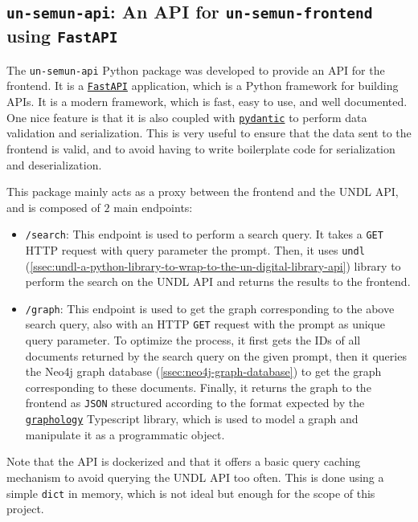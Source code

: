 
\subsection{\texttt{un-semun-api}: An API for \texttt{un-semun-frontend} using \texttt{FastAPI}} \label{ssec:un-semun-api-an-api-for-un-semun-frontend-using-fastapi}

The \texttt{un-semun-api} Python package was developed to provide an API for the frontend. It is a \href{https://fastapi.tiangolo.com/}{\texttt{FastAPI}} application, which is a Python framework for building APIs. It is a modern framework, which is fast, easy to use, and well documented. One nice feature is that it is also coupled with \href{https://docs.pydantic.dev/latest/}{\texttt{pydantic}} to perform data validation and serialization. This is very useful to ensure that the data sent to the frontend is valid, and to avoid having to write boilerplate code for serialization and deserialization.

This package mainly acts as a proxy between the frontend and the UNDL API, and is composed of $2$ main endpoints:

\begin{itemize}
    \item \texttt{/search}: This endpoint is used to perform a search query.  It takes a \texttt{GET} HTTP request with query parameter the prompt. Then, it uses \texttt{undl} (\ref{ssec:undl-a-python-library-to-wrap-to-the-un-digital-library-api}) library to perform the search on the UNDL API and returns the results to the frontend.
    \item \texttt{/graph}: This endpoint is used to get the graph corresponding to the above search query, also with an HTTP \texttt{GET} request with the prompt as unique query parameter. To optimize the process, it first gets the IDs of all documents returned by the search query on the given prompt, then it queries the Neo4j graph database (\ref{ssec:neo4j-graph-database}) to get the graph corresponding to these documents. Finally, it returns the graph to the frontend as \texttt{JSON} structured according to the format expected by the \href{https://graphology.github.io/}{\texttt{graphology}} Typescript library, which is used to model a graph and manipulate it as a programmatic object.
\end{itemize}

Note that the API is dockerized and that it offers a basic query caching mechanism to avoid querying the UNDL API too often. This is done using a simple \texttt{dict} in memory, which is not ideal but enough for the scope of this project.